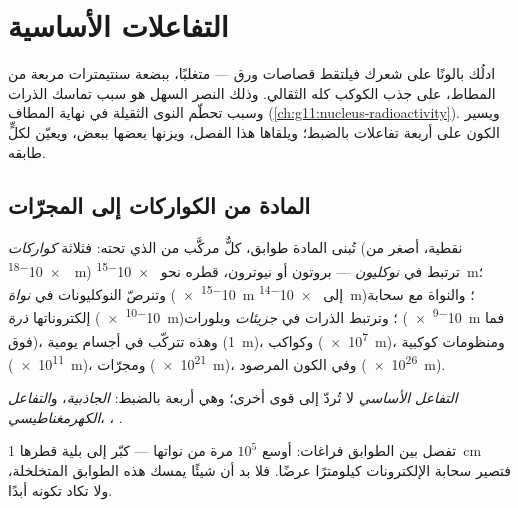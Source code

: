\chapter{التفاعلات الأساسية}\label{ch:g11:fundamental-interactions}

ادلُك بالونًا على شعرك فيلتقط قصاصات ورق --- متغلبًا،
ببضعة سنتيمترات مربعة من المطاط، على جذب الكوكب كله
الثقالي. وذلك النصر السهل هو سبب تماسك الذرات وسبب تحطّم
النوى الثقيلة في نهاية المطاف (\cref{ch:g11:nucleus-radioactivity}).
ويسير الكون على أربعة تفاعلات بالضبط؛ ويلقاها هذا الفصل،
ويزنها بعضها ببعض، ويعيّن لكلٍّ طابقه.

\section{المادة من الكواركات إلى المجرّات}

\begin{definition}[سُلّم البنية]\label{def:g11:fundamental-interactions:ladder}
تُبنى المادة طوابق، كلٌّ مركَّب من الذي تحته: فثلاثة
\emph{كواركات} (نقطية، أصغر من \qty{e-18}{m}) ترتبط
في \emph{نوكليون} --- بروتون أو نيوترون، قطره نحو
\qty{e-15}{m}؛ وتنرصّ النوكليونات في \emph{نواة}
(\qty{e-15}{m} إلى \qty{e-14}{m})؛ والنواة مع سحابة إلكتروناتها
\emph{ذرة} (\qty{e-10}{m})؛ وترتبط الذرات في
\emph{جزيئات} وبلورات (\qty{e-9}{m} فما فوق)، وهذه
تتركّب في أجسام يومية (\qty{1}{m})، وكواكب (\qty{e7}{m})،
ومنظومات كوكبية (\qty{e11}{m})، ومجرّات (\qty{e21}{m})، وفي
الكون المرصود (\qty{e26}{m}).
\end{definition}

\begin{definition}\label{def:g11:fundamental-interactions:four}
\emph{التفاعل الأساسي} 
لا تُردّ إلى قوى أخرى؛ وهي أربعة بالضبط:
\emph{الجاذبية}، و\emph{التفاعل الكهرمغناطيسي}،
، .
\end{definition}

\begin{remark}\label{rem:g11:fundamental-interactions:empty}
تفصل بين الطوابق فراغات:  أوسع $10^{5}$ مرة من
نواتها --- كبّر  إلى بلية قطرها \qty{1}{cm} فتصير
سحابة الإلكترونات كيلومترًا عرضًا. فلا بد أن شيئًا يمسك هذه الطوابق
المتخلخلة، ولا تكاد  تكونه أبدًا.
\end{remark}

